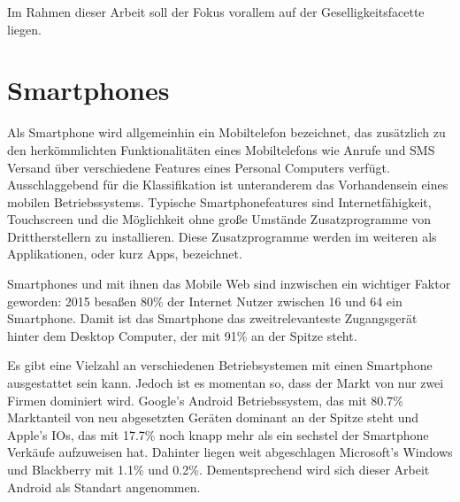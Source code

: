 Im Rahmen dieser Arbeit soll der Fokus vorallem auf der Geselligkeitsfacette liegen.

\section{Smartphones}

\label{ch:Grundlagen:sec:Abschnitt2}


Als Smartphone wird allgemeinhin ein Mobiltelefon bezeichnet, das zusätzlich zu den herkömmlichten Funktionalitäten eines Mobiltelefons wie Anrufe und SMS Versand über verschiedene Features eines Personal Computers verfügt. 
Ausschlaggebend für die Klassifikation ist unteranderem das Vorhandensein eines mobilen Betriebssystems.
Typische Smartphonefeatures sind Internetfähigkeit, Touchscreen und die Möglichkeit ohne große Umstände Zusatzprogramme von Drittherstellern zu installieren.
Diese Zusatzprogramme werden im weiteren als Applikationen, oder kurz Apps, bezeichnet.
\par

Smartphones und mit ihnen das Mobile Web sind inzwischen ein wichtiger Faktor geworden:
2015 besaßen 80\% der Internet Nutzer zwischen 16 und 64 ein Smartphone. 
Damit ist das Smartphone das zweitrelevanteste Zugangsgerät hinter dem Desktop Computer, der mit 91\% an der Spitze steht. \cite{globalwebindex}
\par

Es gibt eine Vielzahl an verschiedenen Betriebsystemen mit einen Smartphone ausgestattet sein kann.
Jedoch ist es momentan so, dass der Markt von nur zwei Firmen dominiert wird.
Google's Android Betriebssystem, das mit 80.7\% Marktanteil von neu abgesetzten Geräten dominant an der Spitze steht
und Apple's IOs, das mit 17.7\% noch knapp mehr als ein sechstel der Smartphone Verkäufe aufzuweisen hat.
Dahinter liegen weit abgeschlagen Microsoft's Windows und Blackberry mit 1.1\% und 0.2\%\cite{smartphonemarktanteil}.
Dementsprechend wird sich dieser Arbeit Android als Standart angenommen.

